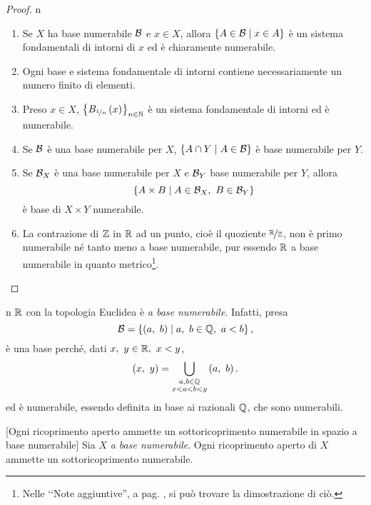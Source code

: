 \begin{proof}{n}~{}
\begin{enumerate}[label=\Roman*]
	\item Se $X$ ha base numerabile $\mathcal{B}$ e $x\in X$, allora $\left\{A\in \mathcal{B}\mid x\in A\right\}$ è un sistema fondamentali di intorni di $x$ ed è chiaramente numerabile.
	\item Ogni base e sistema fondamentale di intorni contiene necessariamente un numero finito di elementi.
	\item Preso $x\in X$, $\left\{B_{\nicefrac{1}{n}}\left(x\right)\right\}_{n\in\mathbb{N}}$ è un sistema fondamentale di intorni ed è numerabile.
	\item Se $\mathcal{B}$ è una base numerabile per $X$, $\left\{A\cap Y\mid A\in \mathcal{B}\right\}$ è base numerabile per $Y$.
	\item Se $\mathcal{B}_X$ è una base numerabile per $X$ e $\mathcal{B}_Y$ base numerabile per $Y$, allora \begin{equation*}
		\left\{A\times B\mid A\in \basis_X,\ B\in\basis_Y\right\}
	\end{equation*}
	è base di $X\times Y$ numerabile.
	\item La contrazione di $\mathbb{Z}$ in $\mathbb{R}$ ad un punto, cioè il quoziente $\nicefrac{\mathbb{R}}{\mathbb{Z}}$, non è primo numerabile né tanto meno a base numerabile, pur essendo $\mathbb{R}$ a base numerabile in quanto metrico\footnote{Nelle ‘‘Note aggiuntive'', a pag. \pageref{dimostrazionenonnumerabilità}, si può trovare la dimostrazione di ciò.}.\qedhere
\end{enumerate}
\end{proof}
\begin{example}{n}
	$\mathbb{R}$ con la topologia Euclidea è \textit{a base numerabile}. Infatti, presa
	\begin{equation*}
		\mathcal{B}=\left\{\left(a,\ b\right)\mid a,\ b\in \mathbb{Q},\ a<b\right\},
	\end{equation*}
	è una base perché, dati $x,\ y\in\mathbb{R},\ x<y$,
	\begin{equation*}
		\left(x,\ y\right)=\bigcup_{\substack{a, b\in\mathbb{Q}\\x<a<b<y}}\left(a,\ b\right).
	\end{equation*}
	ed è numerabile, essendo definita in base ai razionali $\mathbb{Q}$, che sono numerabili.
\end{example}
\begin{proposition}{}[Ogni ricoprimento aperto ammette un sottoricoprimento numerabile in spazio a base numerabile]
Sia $X$ \textit{a base numerabile}. Ogni ricoprimento aperto di $X$ ammette un sottoricoprimento numerabile.
\end{proposition}
